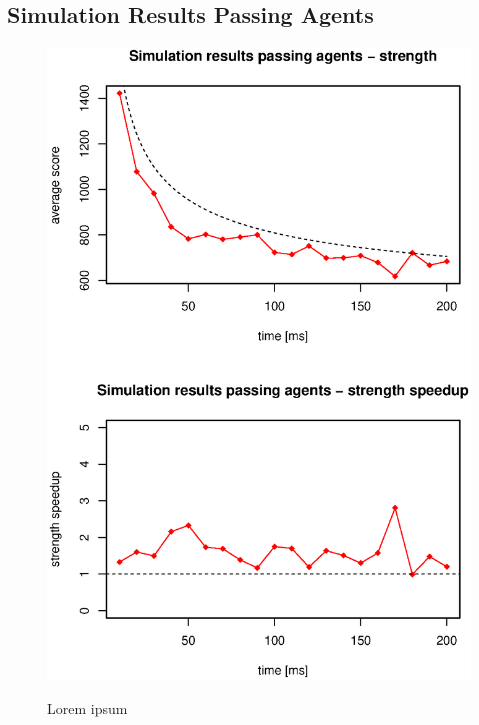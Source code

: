 \subsection{Simulation Results Passing Agents}

\begin{figure}
\begin{center}
\includegraphics{img/simulation-passing-strength.eps}
\end{center}
\caption{\footnotesize Lorem ipsum}{\footnotesize }
\label{fig_simulation_passing_strength}
\end{figure}

